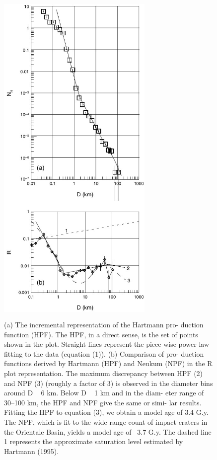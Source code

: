 \documentclass[11pt]{article}
\begin{document}
\begin{figure}[H]
	\centering
	\includegraphics[width=75mm,height=170mm,  scale=0.8]{files/lunar_functions/HPF.jpg}
	\caption{(a) The incremental representation of the Hartmann pro-
		duction function (HPF). The HPF, in a direct sense, is the set of
		points shown in the plot. Straight lines represent the piece-wise
		power law fitting to the data (equation (1)). (b) Comparison of pro-
		duction functions derived by Hartmann (HPF) and Neukum (NPF)
		in the R plot representation. The maximum discrepancy between
		HPF (2) and NPF (3) (roughly a factor of 3) is observed in the
		diameter bins around D ~ 6 km. Below D ~ 1 km and in the diam-
		eter range of 30–100 km, the HPF and NPF give the same or simi-
		lar results. Fitting the HPF to equation (3), we obtain a model age
		of 3.4 G.y. The NPF, which is fit to the wide range count of impact
		craters in the Orientale Basin, yields a model age of ~3.7 G.y. The
		dashed line 1 represents the approximate saturation level estimated
		by Hartmann (1995).}
	\label{HPF}
\end{figure}
\end{document}
